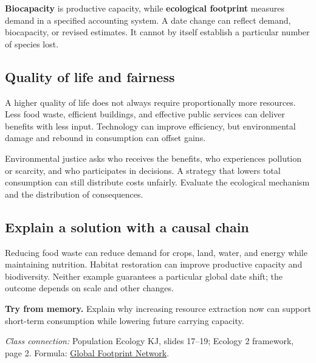 \documentclass[11pt,letterpaper]{article}
\newcommand{\memorycheck}[1]{\par\smallskip\textbf{Try from memory.} #1\par}
\newcommand{\classsource}[1]{{\footnotesize\textit{Class connection:} #1\par}}
\begin{document}
\textbf{Biocapacity} is productive capacity, while \textbf{ecological footprint} measures demand in a specified accounting system. A date change can reflect demand, biocapacity, or revised estimates. It cannot by itself establish a particular number of species lost.
\subsection*{Quality of life and fairness}
A higher quality of life does not always require proportionally more resources. Less food waste, efficient buildings, and effective public services can deliver benefits with less input. Technology can improve efficiency, but environmental damage and rebound in consumption can offset gains.

Environmental justice asks who receives the benefits, who experiences pollution or scarcity, and who participates in decisions. A strategy that lowers total consumption can still distribute costs unfairly. Evaluate the ecological mechanism and the distribution of consequences.
\subsection*{Explain a solution with a causal chain}
Reducing food waste can reduce demand for crops, land, water, and energy while maintaining nutrition. Habitat restoration can improve productive capacity and biodiversity. Neither example guarantees a particular global date shift; the outcome depends on scale and other changes.
\memorycheck{Explain why increasing resource extraction now can support short-term consumption while lowering future carrying capacity.}
\classsource{Population Ecology KJ, slides 17--19; Ecology 2 framework, page 2. Formula: \href{https://overshoot.footprintnetwork.org/about-earth-overshoot-day/}{Global Footprint Network}.}
\end{document}

